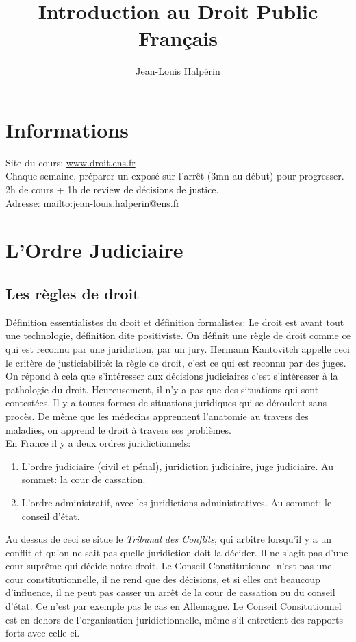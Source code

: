 \documentclass[math]{cours}
\author{Jean-Louis Halpérin}
\title{Introduction au Droit Public Français}
\begin{document}
\bettertitle

\section*{Informations}
Site du cours: \url{www.droit.ens.fr}\\
Chaque semaine, préparer un exposé sur l'arrêt (3mn au début) pour progresser. 2h de cours + 1h de review de décisions de justice.\\
Adresse: \url{mailto:jean-louis.halperin@ens.fr}

\section{L'Ordre Judiciaire}

\subsection{Les règles de droit}
	Définition essentialistes du droit et définition formalistes: Le droit est avant tout une technologie, définition dite positiviste.
	On définit une règle de droit comme ce qui est reconnu par une juridiction, par un jury.
	Hermann Kantovitch appelle ceci le critère de justiciabilité: la règle de droit, c'est ce qui est reconnu par des juges.
	On répond à cela que s'intéresser aux décisions judiciaires c'est s'intéresser à la pathologie du droit.
	Heureusement, il n'y a pas que des situations qui sont contestées.
	Il y a toutes formes de situations juridiques qui se déroulent sans procès.
	De même que les médecins apprennent l'anatomie au travers des maladies, on apprend le droit à travers ses problèmes. \\

	En France il y a deux ordres juridictionnels:
	\begin{enumerate}
		\item L'ordre judiciaire (civil et pénal), juridiction judiciaire, juge judiciaire. Au sommet: la cour de cassation.
		\item L'ordre administratif, avec les juridictions administratives. Au sommet: le conseil d'état.
	\end{enumerate}
	Au dessus de ceci se situe le \emph{Tribunal des Conflits}, qui arbitre lorsqu'il y a un conflit et qu'on ne sait pas quelle juridiction doit la décider.
	Il ne s'agit pas d'une cour suprême qui décide notre droit.
	Le Conseil Constitutionnel n'est pas une cour constitutionnelle, il ne rend que des décisions, et si elles ont beaucoup d'influence, il ne peut pas casser un arrêt de la cour de cassation ou du conseil d'état.
	Ce n'est par exemple pas le cas en Allemagne.
	Le Conseil Consitutionnel est en dehors de l'organisation juridictionnelle, même s'il entretient des rapports forts avec celle-ci.
\end{document}
